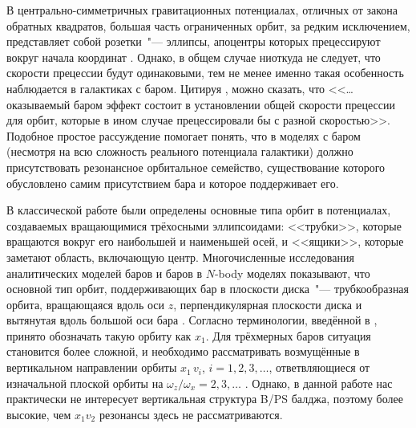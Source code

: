 \documentclass[tikz]{trlnotes}
\begin{document}
\newlength{\imageheight}
\imageheight=5.5cm
В центрально-симметричных гравитационных потенциалах, отличных от закона обратных квадратов, большая часть ограниченных орбит, за редким исключением, представляет собой розетки~"--- эллипсы, апоцентры которых прецессируют вокруг начала координат \citep{book:14857}. Однако, в общем случае ниоткуда не следует, что скорости прецессии будут одинаковыми, тем не менее именно такая особенность наблюдается в галактиках с баром.
Цитируя \cite{sellwood2014a}, можно сказать, что <<\ldots оказываемый баром эффект состоит в установлении общей скорости
прецессии для орбит, которые в ином случае прецессировали бы с разной скоростью>>.
Подобное простое рассуждение помогает понять, что в моделях с баром (несмотря на всю сложность реального потенциала галактики)
должно присутствовать резонансное орбитальное семейство, существование которого обусловлено самим присутствием бара и которое поддерживает его.

В классической работе \citet{dezeeuw1985} были определены основные типа орбит в потенциалах, создаваемых вращающимися трёхосными эллипсоидами: <<трубки>>, которые вращаются вокруг его наибольшей и наименьшей осей, и <<ящики>>, которые заметают область, включающую центр.  Многочисленные исследования аналитических моделей баров и баров в $N$-body моделях показывают, что основной тип орбит, поддерживающих бар в плоскости диска~"--- трубкообразная орбита, вращающаяся вдоль оси $z$, перпендикулярная плоскости диска и вытянутая вдоль большой оси бара \citep{athanassoula2003}. Согласно терминологии, введённой в \citet{contopoulos1980a}, принято обозначать такую
орбиту как $x_1$. Для трёхмерных баров ситуация становится более сложной, и необходимо рассматривать возмущённые в
вертикальном направлении орбиты $x_1\,v_i$, $i=1,2,3, \dotsc$,
ответвляющиеся от изначальной плоской орбиты на
$ω_z/ω_x = 2,3, \dotsc$ \citep{skokos2002a,pfenniger1991}. Однако, в данной работе нас практически не интересует
вертикальная структура B/PS балджа, поэтому более высокие, чем $x_1v_2$ резонансы здесь не рассматриваются.
\end{document}
